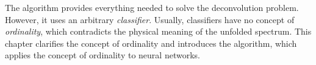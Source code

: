 The \dsea{} algorithm provides everything needed to solve the deconvolution problem.
However,
it uses an arbitrary \emph{classifier}.
Usually,
  classifiers have no concept of \emph{ordinality},
which contradicts the physical meaning of the unfolded spectrum.
%
This chapter
  clarifies the concept of ordinality
  and
  introduces the \corn{} algorithm,
    which applies the concept of ordinality to neural networks.
